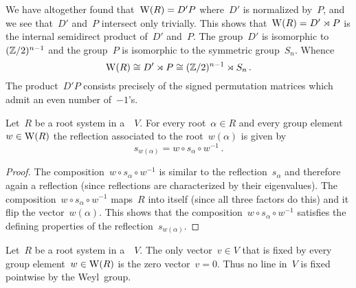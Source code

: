 \begin{examples}
\begin{enumerate}
      We have altogether found that~$\operatorname{W}(R) = D' P$ where~$D'$ is normalized by~$P$, and we see that~$D'$ and~$P$ intersect only trivially.
      This shows that~$\operatorname{W}(R) = D' \rtimes P$ is the internal semidirect product of~$D'$ and~$P$.
      The group~$D'$ is isomorphic to~$(\mathbb{Z}/2)^{n-1}$ and the group~$P$ is isomorphic to the symmetric group~$S_n$.
      Whence
      \[
        \operatorname{W}(R)
        \cong
        D' \rtimes P
        \cong
        (\mathbb{Z}/2)^{n-1} \rtimes S_n \,.
      \]
      The product~$D' P$ consists precisely of the signed permutation matrices which admit an even number of~$-1$’s.
  \end{enumerate}
\end{examples}


\begin{lemma}
  \label{reflection of conjugated root}
  Let~$R$ be a root system in a~{\vectorspace{$\kf$}}~$V$.
  For every root~$\alpha \in R$ and every group element~$w \in \operatorname{W}(R)$ the reflection associated to the root~$w(\alpha)$ is given by
  \[
    s_{w(\alpha)}
    =
    w \circ s_\alpha \circ w^{-1} \,.
  \]
\end{lemma}


\begin{proof}
  The composition~$w \circ s_\alpha \circ w^{-1}$ is similar to the reflection~$s_\alpha$ and therefore again a reflection (since reflections are characterized by their eigenvalues).
  The composition~$w \circ s_\alpha \circ w^{-1}$ maps~$R$ into itself (since all three factors do this) and it flip the vector~$w(\alpha)$.
  This shows that the composition~$w \circ s_\alpha \circ w^{-1}$ satisfies the defining properties of the reflection~$s_{w(\alpha)}$.
\end{proof}


\begin{lemma}
  \label{weyl groups fixes no line}
  Let~$R$ be a root system in a~{\vectorspace{$\kf$}}~$V$.
  The only vector~$v \in V$ that is fixed by every group element~$w \in \operatorname{W}(R)$ is the zero vector~$v = 0$.
  Thus no line in~$V$ is fixed pointwise by the Weyl~group.
\end{lemma}



